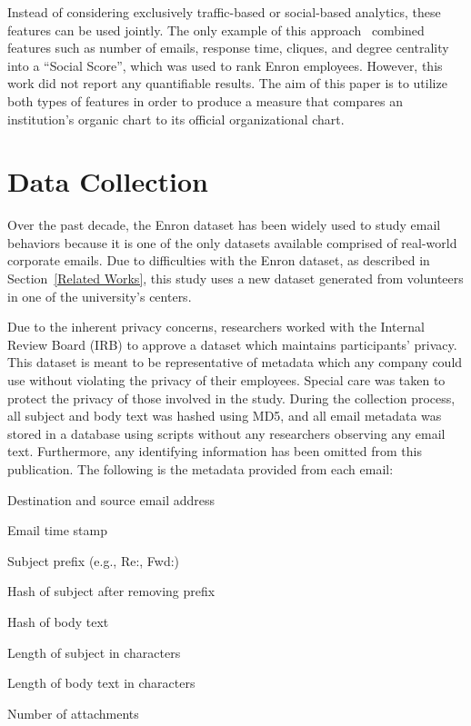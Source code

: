 \documentclass[10pt,twocolumn,conference]{IEEEtran}
\begin{document}
Instead of considering exclusively traffic-based or social-based analytics, these features can be used jointly.
The only example of this approach~\cite{rowe_automated_2007} combined features such as number of emails, response time, cliques, and degree centrality into a ``Social Score'', which was used to rank Enron employees.  
However, this work did not report any quantifiable results.
The aim of this paper is to utilize both types of features in order to produce a measure that compares an institution's organic chart to its official organizational chart.

\section{Data Collection} \label{Data Collection}

Over the past decade, the Enron dataset has been widely used to study email behaviors because it is one of the only datasets available comprised of real-world corporate emails.
Due to difficulties with the Enron dataset, as described in Section~\ref{Related Works}, this study uses a new dataset generated from volunteers in one of the university's centers.

Due to the inherent privacy concerns, researchers worked with the Internal Review Board (IRB) to approve a dataset which maintains participants' privacy.
This dataset is meant to be representative of metadata which any company could use without violating the privacy of their employees.
Special care was taken to protect the privacy of those involved in the study.
During the collection process, all subject and body text was hashed using MD5, and all email metadata was stored in a database using scripts without any researchers observing any email text.
Furthermore, any identifying information has been omitted from this publication.
The following is the metadata provided from each email:
\begin{compactitem}
\item Destination and source email address
\item Email time stamp
\item Subject prefix (e.g., Re:, Fwd:)
\item Hash of subject after removing prefix
\item Hash of body text
\item Length of subject in characters
\item Length of body text in characters
\item Number of attachments
\end{compactitem}
\end{document}
